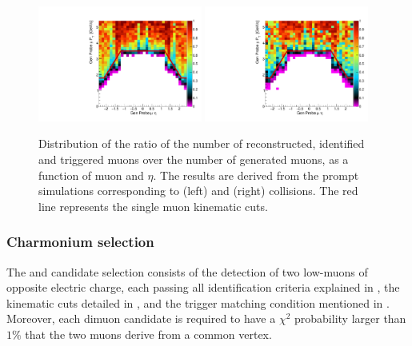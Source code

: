 \begin{figure}[htb!]
 \centering 
  \includegraphics[width=0.48\textwidth]{Figures/Charmonia/Analysis/EventSelection/pp_AccxEff_SingleMuons}
  \includegraphics[width=0.48\textwidth]{Figures/Charmonia/Analysis/EventSelection/PbPb_AccxEff_SingleMuons} 
 \caption{Distribution of the ratio of the number of reconstructed, identified and triggered muons over the number of generated muons, as a function of muon \pt and $\eta$. The results are derived from the prompt \JPsi simulations corresponding to \Runpp (left) and \RunPbPb (right) collisions. The red line represents the single muon kinematic cuts.}
 \label{fig:SingleMuonAccEff}
\end{figure}


\subsubsection{Charmonium selection} \label{sec:Charmonia_Analysis_Selection_CharmoniumSelection}

The \JPsiToMuMu and \PsiPToMuMu candidate selection consists of the detection of two low-\pt muons of opposite electric charge, each passing all identification criteria explained in , the kinematic cuts detailed in , and the trigger matching condition mentioned in . Moreover, each dimuon candidate is required to have a $\chi^2$ probability larger than $1\%$ that the two muons derive from a common vertex.


